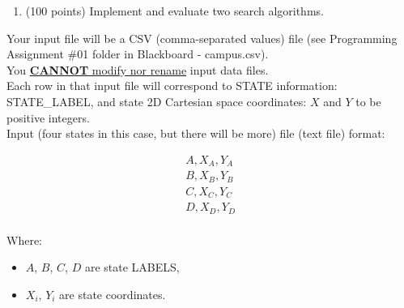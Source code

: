 \documentclass[
	type={Programming},
	assignment={1},
	points={100},
	duedate={Sunday, March 3, 2024, 11:59 CST},
	template=true,
]{cs581homework}
\begin{document}
\maketitle

\begin{objectives}
	\begin{enumerate}[label=\arabic*.]
		\item (100 points) Implement and evaluate two search algorithms.\\
	\end{enumerate}
\end{objectives}

\begin{inputdata}
	Your input file will be a CSV (comma-separated values) file (see Programming Assignment \#01 folder in Blackboard - campus.csv).\\

	You \underline{\textbf{CANNOT} modify nor rename} input data files.\\

	Each row in that input file will correspond to STATE information: STATE\_LABEL, and state 2D Cartesian space coordinates: $X$ and $Y$ to be positive integers.\\

	Input (four states in this case, but there will be more) file (text file) format:

	\begin{equation*}
	\begin{aligned}
		A,X_{A},Y_{A}\\
		B,X_{B},Y_{B}\\
		C,X_{C},Y_{C}\\
		D,X_{D},Y_{D}\\
	\end{aligned}
	\end{equation*}

	Where:
	\begin{itemize}
		\item $A$, $B$, $C$, $D$ are state LABELS,
		\item $X_{i}$, $Y_{i}$ are state coordinates.
	\end{itemize}
\end{inputdata}

\deliverables
\end{document}
